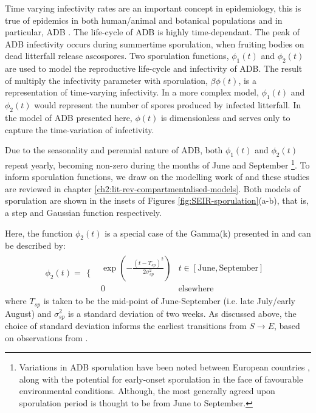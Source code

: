 Time varying infectivity rates are an important concept in epidemiology, this is true of epidemics in both human/animal \cite{svensson2007note, liu2012infectious} 
and botanical populations \cite{suffert2018some, leclerc2014estimating, time-varying-infectivity} and in particular, ADB \cite{grosdidier2018tracking, hietala2013invasive}. 
The life-cycle of ADB is highly time-dependant. The peak of ADB infectivity occurs during summertime sporulation, when fruiting bodies on dead litterfall release ascospores.
Two sporulation functions, $\phi_1(t)$ and $\phi_2(t)$ are used to model the reproductive life-cycle and infectivity of ADB.
The result of multiply the infectivity parameter with sporulation, $\beta\phi(t)$, is a representation of time-varying infectivity. 
In a more complex model, $\phi_1(t)$ and $\phi_2(t)$ would represent the number of spores produced by infected litterfall. In the model of ADB presented here, $\phi(t)$ is dimensionless and serves only to capture the time-variation of infectivity.

Due to the seasonality and perennial nature of ADB, both $\phi_1(t)$ and $\phi_2(t)$ repeat yearly, becoming non-zero during the months of June and September
\footnote{Variations in ADB sporulation have been noted between European countries \cite{https://doi.org/10.1111/mpp.12073}, along with the potential for early-onset sporulation in the face of favourable environmental conditions. Although, the most generally agreed upon sporulation period is thought to be from June to September.}.
To inform sporulation functions, we draw on the modelling work of \cite{time-varying-infectivity} and \cite{segarra2001epidemic}
\textemdash these studies are reviewed in chapter \ref{ch2:lit-rev-compartmentalised-models}. 
Both models of sporulation are shown in the insets of Figures \ref{fig:SEIR-sporulation}(a-b), that is, a step and Gaussian function respectively. 

Here, the function $\phi_2(t)$ is a special case of the Gamma(k) presented in \cite{time-varying-infectivity, segarra2001epidemic} and can be described by:
\begin{equation}
\label{eq:step-function}
\phi_2(t) = 
\begin{array}{cc}
  \{ & 
    \begin{array}{cc}
      \exp(-\frac{(t - T_{sp})^2}{2\sigma_{sp}^2}) & t \in[\mathrm{June}, \mathrm{September}] \\
      0 & \mathrm{elsewhere}
    \end{array}
\end{array}
\end{equation}
where $T_{sp}$ is taken to be the mid-point of June-September (i.e. late July/early August) and $\sigma_{sp}^2$ is a standard deviation of two weeks. As discussed above, the choice of standard deviation informs the earliest transitions from $S\rightarrow E$, based on observations from \cite{grosdidier2018tracking, hietala2013invasive}. 

